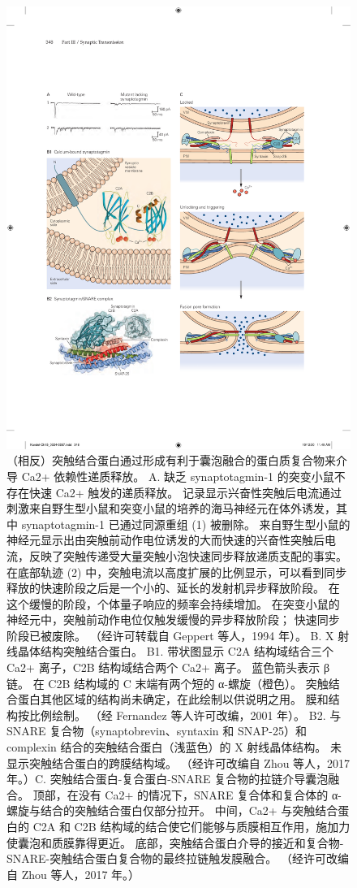 \begin{figure}[htbp]
	\centering
	\includegraphics[width=0.9\linewidth]{chap15/fig_15_13}
	\caption{（相反）突触结合蛋白通过形成有利于囊泡融合的蛋白质复合物来介导 Ca2+ 依赖性递质释放。 A. 缺乏 synaptotagmin-1 的突变小鼠不存在快速 Ca2+ 触发的递质释放。 记录显示兴奋性突触后电流通过刺激来自野生型小鼠和突变小鼠的培养的海马神经元在体外诱发，其中 synaptotagmin-1 已通过同源重组 (1) 被删除。 来自野生型小鼠的神经元显示出由突触前动作电位诱发的大而快速的兴奋性突触后电流，反映了突触传递受大量突触小泡快速同步释放递质支配的事实。 在底部轨迹 (2) 中，突触电流以高度扩展的比例显示，可以看到同步释放的快速阶段之后是一个小的、延长的发射机异步释放阶段。 在这个缓慢的阶段，个体量子响应的频率会持续增加。 在突变小鼠的神经元中，突触前动作电位仅触发缓慢的异步释放阶段； 快速同步阶段已被废除。 （经许可转载自 Geppert 等人，1994 年）。 B. X 射线晶体结构突触结合蛋白。 B1. 带状图显示 C2A 结构域结合三个 Ca2+ 离子，C2B 结构域结合两个 Ca2+ 离子。 蓝色箭头表示 β 链。 在 C2B 结构域的 C 末端有两个短的 α-螺旋（橙色）。 突触结合蛋白其他区域的结构尚未确定，在此绘制以供说明之用。 膜和结构按比例绘制。 （经 Fernandez 等人许可改编，2001 年）。 B2. 与 SNARE 复合物（synaptobrevin、syntaxin 和 SNAP-25）和 complexin 结合的突触结合蛋白（浅蓝色）的 X 射线晶体结构。 未显示突触结合蛋白的跨膜结构域。 （经许可改编自 Zhou 等人，2017 年。）C. 突触结合蛋白-复合蛋白-SNARE 复合物的拉链介导囊泡融合。 顶部，在没有 Ca2+ 的情况下，SNARE 复合体和复合体的 α-螺旋与结合的突触结合蛋白仅部分拉开。 中间，Ca2+ 与突触结合蛋白的 C2A 和 C2B 结构域的结合使它们能够与质膜相互作用，施加力使囊泡和质膜靠得更近。 底部，突触结合蛋白介导的接近和复合物-SNARE-突触结合蛋白复合物的最终拉链触发膜融合。 （经许可改编自 Zhou 等人，2017 年。）}
	\label{fig:15_13}
\end{figure}


